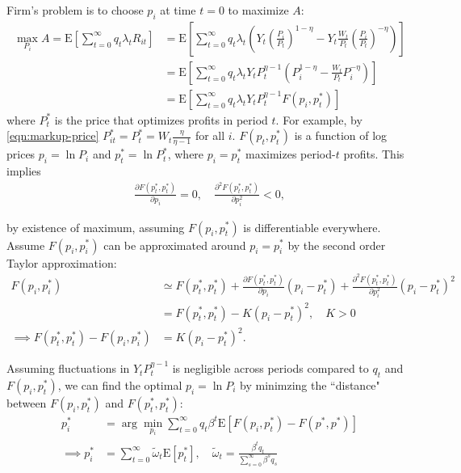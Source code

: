 \documentclass{article}
\newcommand{\E}[1]{\mathrm{E}\left[#1\right]}
\newcommand{\?}{\textcolor{red}{(?)}} %
\begin{document}
        Firm's problem is to choose $p_i$ at time $t=0$ to maximize $A$:
        \begin{align}
            \max_{P_i} A = \E{\sum_{t=0}^\infty q_t \lambda_t R_{it}}
            &= \E{\sum_{t=0}^\infty q_t \lambda_t
            \left(
                Y_t \left(\frac{{P_i}}{P_t}\right)^{1-\eta} - Y_t\frac{W_t}{P_t} \left(\frac{{P_i}}{P_t}\right)^{-\eta}
                \right)}
            \\
            &= \E{\sum_{t=0}^\infty q_t \lambda_t
            Y_t P_t^{\eta - 1}\left(
                P_i^{1-\eta} - \frac{W_t}{P_t} P_i^{-\eta}
                \right)}
            \\
            &= \E{\sum_{t=0}^\infty q_t \lambda_t
            Y_t P_t^{\eta - 1} F(p_i, p_t^*)}
        \end{align}
        where $P_t^*$ is the price that optimizes profits in period $t$.  For example, by \eqref{eqn:markup-price} $P_{it}^* = P_{t}^* = W_t\frac{\eta}{\eta-1}$ for all $i$. $F(p_t, p_t^*)$ is a function of log prices $p_i = \ln{P_i}$ and $p_t^* = \ln{P_t^*}$, where $p_i = p_t^*$ maximizes period-$t$ profits. This implies
        \begin{align}
            \frac{\partial F(p_t^*, p_t^*)}{\partial p_i} = 0,
            \quad
            \frac{\partial^2 F(p_t^*, p_t^*)}{\partial p_i^2} < 0,
        \end{align}
        
        by existence of maximum, assuming $F(p_i, p_t^*)$ is differentiable everywhere. Assume $F(p_i, p_i^*)$ can be approximated around $p_i = p_i^*$ by the second order Taylor approximation:
        \begin{align}
            F(p_i, p_i^*)
            &\simeq F(p_t^*, p_t^*) +  \frac{\partial F(p_t^*, p_t^*)}{\partial p_i} (p_i - p_t^*) + \frac{\partial^2 F(p_t^*, p_t^*)}{\partial p_i^2} (p_i - p_t^*)^2
            \\
            &= F(p_t^*, p_t^*) - K (p_i - p_t^*)^2, \quad K > 0
            \\
            \implies
            F(p_t^*, p_t^*) - F(p_i, p_i^*) &= K(p_i - p_t^*)^2.
        \end{align}
        
        Assuming fluctuations in $Y_t P_t^{\eta - 1}$ is negligible across periods compared to $q_t$ and $F(p_i, p_t^*)$, we can find the optimal $p_i = \ln P_i$ by minimzing the ``distance" between $F(p_i, p_t^*)$ and $F(p_t^*, p_t^*)$:
        \begin{align}
            p_i^*
            &= \arg\min_{p_i} \sum_{t=0}^\infty q_t \beta^t \E{F(p_i, p_t^*) - F(p^*, p^*)}
            \\
            \implies p_i^*
            &= \sum_{t=0}^\infty \tilde\omega_t \E{p_t^*}, \quad
            \tilde\omega_t = \frac{\beta^t q_t}{\sum_{s=0}^\infty \beta^s q_s}
            \label{eqn:p-star}
        \end{align}
        
\end{document}

